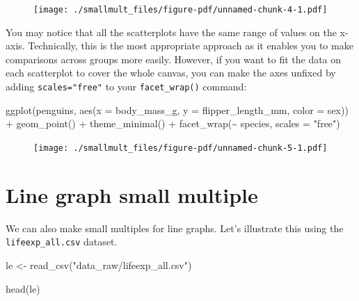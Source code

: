 \documentclass[
  letterpaper,
  DIV=11,
  numbers=noendperiod]{scrreprt}
\newenvironment{Shaded}{\begin{snugshade}}{\end{snugshade}}
\newcommand{\AttributeTok}[1]{\textcolor[rgb]{0.40,0.45,0.13}{#1}}
\newcommand{\FunctionTok}[1]{\textcolor[rgb]{0.28,0.35,0.67}{#1}}
\newcommand{\NormalTok}[1]{\textcolor[rgb]{0.00,0.23,0.31}{#1}}
\newcommand{\OtherTok}[1]{\textcolor[rgb]{0.00,0.23,0.31}{#1}}
\newcommand{\SpecialCharTok}[1]{\textcolor[rgb]{0.37,0.37,0.37}{#1}}
\newcommand{\StringTok}[1]{\textcolor[rgb]{0.13,0.47,0.30}{#1}}
\begin{document}
\begin{figure}[H]

{\centering \texttt{[image: ./smallmult\_files/figure-pdf/unnamed-chunk-4-1.pdf]}

}

\end{figure}

You may notice that all the scatterplots have the same range of values
on the x-axis. Technically, this is the most appropriate approach as it
enables you to make comparisons across groups more easily. However, if
you want to fit the data on each scatterplot to cover the whole canvas,
you can make the axes unfixed by adding \texttt{scales="free"} to your
\texttt{facet\_wrap()} command:

\begin{Shaded}
\begin{Highlighting}[]
\FunctionTok{ggplot}\NormalTok{(penguins, }\FunctionTok{aes}\NormalTok{(}\AttributeTok{x =}\NormalTok{ body\_mass\_g,  }\AttributeTok{y =}\NormalTok{ flipper\_length\_mm, }\AttributeTok{color =}\NormalTok{ sex)) }\SpecialCharTok{+} 
  \FunctionTok{geom\_point}\NormalTok{() }\SpecialCharTok{+}
  \FunctionTok{theme\_minimal}\NormalTok{() }\SpecialCharTok{+}
  \FunctionTok{facet\_wrap}\NormalTok{(}\SpecialCharTok{\textasciitilde{}}\NormalTok{ species, }\AttributeTok{scales =} \StringTok{"free"}\NormalTok{)}
\end{Highlighting}
\end{Shaded}

\begin{figure}[H]

{\centering \texttt{[image: ./smallmult\_files/figure-pdf/unnamed-chunk-5-1.pdf]}

}

\end{figure}

\hypertarget{line-graph-small-multiple}{%
\section{\texorpdfstring{\textbf{Line graph small
multiple}}{Line graph small multiple}}\label{line-graph-small-multiple}}

We can also make small multiples for line graphs. Let's illustrate this
using the \texttt{lifeexp\_all.csv} dataset.

\begin{Shaded}
\begin{Highlighting}[]
\NormalTok{le }\OtherTok{\textless{}{-}} \FunctionTok{read\_csv}\NormalTok{(}\StringTok{"data\_raw/lifeexp\_all.csv"}\NormalTok{)}

\FunctionTok{head}\NormalTok{(le)}
\end{Highlighting}
\end{Shaded}
\end{document}
